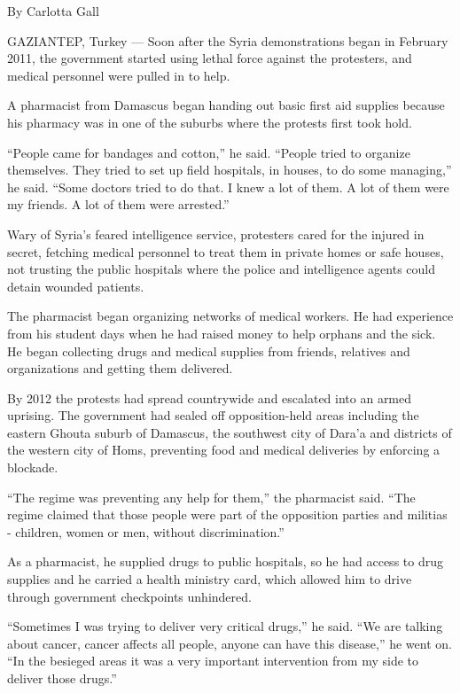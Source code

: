 By Carlotta Gall

GAZIANTEP, Turkey --- Soon after the Syria demonstrations began in
February 2011, the government started using lethal force against the
protesters, and medical personnel were pulled in to help.

A pharmacist from Damascus began handing out basic first aid supplies
because his pharmacy was in one of the suburbs where the protests first
took hold.

``People came for bandages and cotton,'' he said. ``People tried to
organize themselves. They tried to set up field hospitals, in houses, to
do some managing,'' he said. ``Some doctors tried to do that. I knew a
lot of them. A lot of them were my friends. A lot of them were
arrested.''

Wary of Syria's feared intelligence service, protesters cared for the
injured in secret, fetching medical personnel to treat them in private
homes or safe houses, not trusting the public hospitals where the police
and intelligence agents could detain wounded patients.

The pharmacist began organizing networks of medical workers. He had
experience from his student days when he had raised money to help
orphans and the sick. He began collecting drugs and medical supplies
from friends, relatives and organizations and getting them delivered.

By 2012 the protests had spread countrywide and escalated into an armed
uprising. The government had sealed off opposition-held areas including
the eastern Ghouta suburb of Damascus, the southwest city of Dara'a and
districts of the western city of Homs, preventing food and medical
deliveries by enforcing a blockade.

``The regime was preventing any help for them,'' the pharmacist said.
``The regime claimed that those people were part of the opposition
parties and militias - children, women or men, without discrimination.''

As a pharmacist, he supplied drugs to public hospitals, so he had access
to drug supplies and he carried a health ministry card, which allowed
him to drive through government checkpoints unhindered.

``Sometimes I was trying to deliver very critical drugs,'' he said. ``We
are talking about cancer, cancer affects all people, anyone can have
this disease,'' he went on. ``In the besieged areas it was a very
important intervention from my side to deliver those drugs.''

